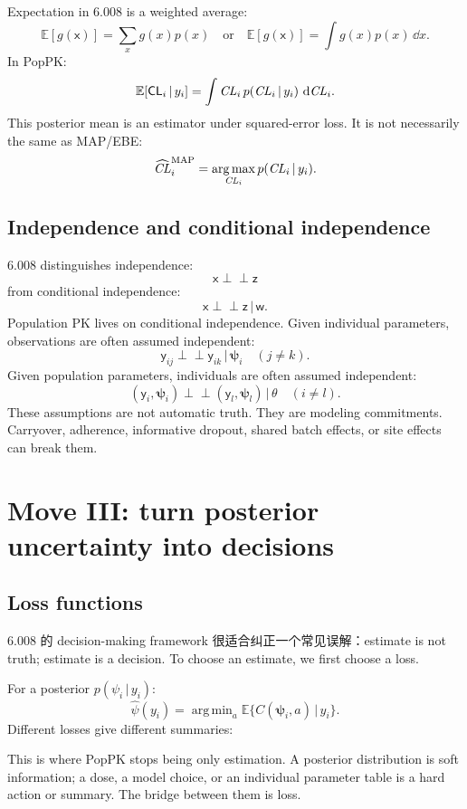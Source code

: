 \documentclass[a4paper]{article}
\DeclareMathOperator*{\argmax}{arg\,max}
\DeclareMathOperator*{\argmin}{arg\,min}
\newcommand{\rv}[1]{\mathsf{#1}}
\newcommand{\rpsi}{\boldsymbol{\psi}}
\newcommand{\given}{\,|\,}
\newcommand{\E}{\mathbb{E}}
\newcommand{\indep}{\perp\!\!\!\perp}
\begin{document}
Expectation in 6.008 is a weighted average:
\[
  \E[g(\rv{x})]=\sum_x g(x)p(x)
  \quad \text{or} \quad
  \E[g(\rv{x})]=\int g(x)p(x)\,\dd x.
\]
In PopPK:
\[
  \E[\rv{CL}_i\given y_i]
  =
  \int \pksym{CL}_i\,p(\pksym{CL}_i\given y_i)\,\dd \pksym{CL}_i.
\]
This posterior mean is an estimator under squared-error loss. It is not necessarily the same as MAP/EBE:
\[
  \widehat{\pksym{CL}}^{\pklab{MAP}}_i
  =
  \argmax_{\pksym{CL}_i}p(\pksym{CL}_i\given y_i).
\]

\subsection{Independence and conditional independence}

6.008 distinguishes independence:
\[
  \rv{x}\indep \rv{z}
\]
from conditional independence:
\[
  \rv{x}\indep \rv{z}\given \rv{w}.
\]
Population PK lives on conditional independence. Given individual parameters, observations are often assumed independent:
\[
  \rv{y}_{ij}\indep \rv{y}_{ik}\given \rpsi_i
  \quad (j\ne k).
\]
Given population parameters, individuals are often assumed independent:
\[
  (\rv{y}_i,\rpsi_i)
  \indep
  (\rv{y}_l,\rpsi_l)
  \given \theta
  \quad (i\ne l).
\]
These assumptions are not automatic truth. They are modeling commitments. Carryover, adherence, informative dropout, shared batch effects, or site effects can break them.

\section{Move III: turn posterior uncertainty into decisions}

\subsection{Loss functions}

6.008 的 decision-making framework 很适合纠正一个常见误解：estimate is not truth; estimate is a decision. To choose an estimate, we first choose a loss.

For a posterior \(p(\psi_i\given y_i)\):
\[
  \widehat{\psi}(y_i)
  =
  \argmin_a
  \E\{C(\rpsi_i,a)\given y_i\}.
\]
Different losses give different summaries:

This is where PopPK stops being only estimation.  A posterior distribution is soft information; a dose, a model choice, or an individual parameter table is a hard action or summary.  The bridge between them is loss.
\end{document}
